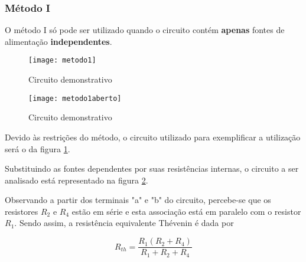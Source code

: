 \documentclass[12pt,fleqn]{book} %
\begin{document}
        \subsubsection{Método I}{
        
\begin{remark}
O método I só pode ser utilizado quando o circuito contém \textbf{apenas} fontes de alimentação \textbf{independentes}.
\end{remark}        

        \begin{figure}[!htbp] \centering\texttt{[image: metodo1]}
            \caption{Circuito demonstrativo}\label{metodo1} 
        \end{figure}
        \begin{figure}[!htbp] \centering\texttt{[image: metodo1aberto]}
            \caption{Circuito demonstrativo}\label{metodo1aberto} 
        \end{figure}
        
Devido às restrições do método, o circuito utilizado para exemplificar a utilização será o da figura \ref{metodo1}.

Substituindo as fontes dependentes por suas resistências internas, o circuito a ser analisado está representado na figura \ref{metodo1aberto}.

Observando a partir dos terminais "a" e "b" do circuito, percebe-se que os resistores $R_2$ e $R_4$ estão em série e esta associação está em paralelo com o resistor $R_1$. Sendo assim, a resistência equivalente Thévenin é dada por 

\begin{equation}
R_{th}=\frac{R_1 (R_2+R_4)}{R_1+R_2+R_4}
\end{equation}
}
        
        
\end{document}
